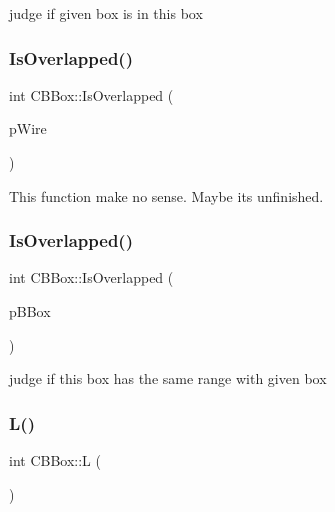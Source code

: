judge if given box is in this box \mbox{\label{classCBBox_ae38173ceac641fb233a941299764f519}} 
\subsubsection{\texorpdfstring{IsOverlapped()}{IsOverlapped()}\hspace{0.1cm}{\footnotesize\ttfamily [1/2]}}
{\footnotesize\ttfamily int C\+B\+Box\+::\+Is\+Overlapped (\begin{DoxyParamCaption}\item[{\mbox{\hyperlink{classCWire}{C\+Wire}} $\ast$}]{p\+Wire }\end{DoxyParamCaption})}

This function make no sense. Maybe it\textquotesingle{}s unfinished. \mbox{\label{classCBBox_afbd0200a17c5610ec613482020213970}} 
\subsubsection{\texorpdfstring{IsOverlapped()}{IsOverlapped()}\hspace{0.1cm}{\footnotesize\ttfamily [2/2]}}
{\footnotesize\ttfamily int C\+B\+Box\+::\+Is\+Overlapped (\begin{DoxyParamCaption}\item[{\mbox{\hyperlink{classCBBox}{C\+B\+Box}} $\ast$}]{p\+B\+Box }\end{DoxyParamCaption})}

judge if this box has the same range with given box \mbox{\label{classCBBox_a8dbcaa755e35418d1c90b1ab3748c0d8}} 
\subsubsection{\texorpdfstring{L()}{L()}}
{\footnotesize\ttfamily int C\+B\+Box\+::L (\begin{DoxyParamCaption}{ }\end{DoxyParamCaption})\hspace{0.3cm}{\ttfamily [inline]}}

\mbox{\label{classCBBox_a596b6427a7047a1827b0dfd2ab767ec3}} 

